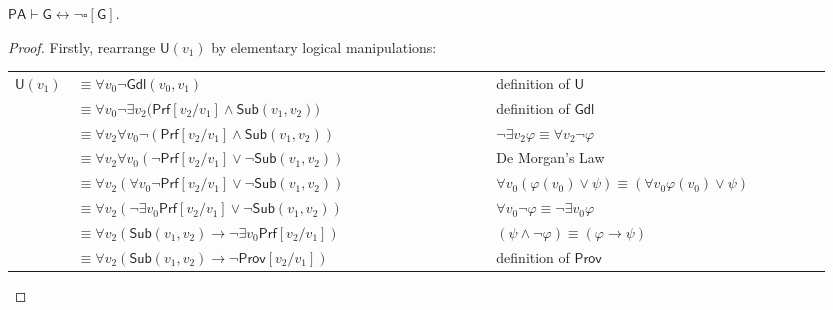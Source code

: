 \begin{lem} \label{lem:GProvequi}
$\mathsf{PA \vdash G }\leftrightarrow \lnot \square[\mathsf{G}]$.
\end{lem}
\begin{proof}
Firstly, rearrange $\mathsf{U}(v_1)$ by elementary logical manipulations:

\begin{nscenter}
  \begin{tabular}{p{0.05\linewidth}p{0.5\linewidth}p{0.4\linewidth}}
  $\mathsf{U}(v_1)$ & $\equiv \forall v_0  \lnot \mathsf{Gdl}(v_0,v_1)$ & definition of $\mathsf{U}$ \\
   & $\equiv \forall v_0  \lnot \exists v_2  \mathsf{(Prf}[v_2/v_1] \wedge \mathsf{Sub}(v_1,v_2))$ & definition of $\mathsf{Gdl}$ \\
   & $\equiv \forall v_2 \forall v_0  \lnot (\mathsf{Prf}[v_2/v_1] \wedge\mathsf{ Sub}(v_1,v_2))$ & $\lnot \exists v_2 \varphi \equiv \forall v_2  \lnot\varphi$ \\
   & $\equiv \forall v_2 \forall v_0  ( \lnot \mathsf{Prf}[v_2/v_1] \vee\lnot \mathsf{ Sub}(v_1,v_2))$ & De Morgan's Law\\
    & $\equiv \forall v_2  (\forall v_0 \lnot \mathsf{Prf}[v_2/v_1] \vee \lnot \mathsf{Sub}(v_1,v_2))$ &  $ \forall v_0 (\varphi(v_0)\vee \psi ) \equiv  ( \forall v_0 \varphi(v_0)\vee \psi)$ \\   
    & $\equiv \forall v_2  (\lnot\exists v_0 \mathsf{Prf}[v_2/v_1] \vee \lnot \mathsf{Sub}(v_1,v_2))$ &  $ \forall v_0 \lnot \varphi \equiv \lnot \exists v_0 \varphi $ \\
   & $ \equiv \forall v_2 (\mathsf{Sub}(v_1,v_2) \rightarrow \lnot \exists v_0  \mathsf{Prf}[v_2/v_1])$ & $( \psi \wedge \lnot \varphi)\equiv(\varphi \rightarrow \psi)   $\\
   & $\equiv\forall v_2 (\mathsf{Sub}(v_1,v_2) \rightarrow \lnot \mathsf{Prov}[v_2/v_1])$ & definition of $\mathsf{Prov}$
  \end{tabular}
\end{nscenter}


\end{proof}
